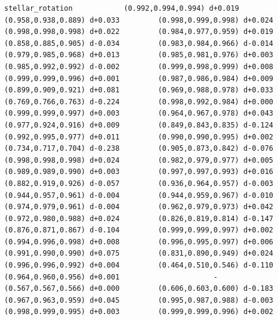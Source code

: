 \documentclass[11pt, letterpaper, openany]{book}
\begin{document}
\begin{empiricalbox}
\begin{lstlisting}[style=terminal]
stellar_rotation            (0.992,0.994,0.994) d+0.019         (0.958,0.938,0.889) d+0.033         (0.998,0.999,0.998) d+0.024         (0.998,0.998,0.998) d+0.022         (0.984,0.977,0.959) d+0.019         (0.858,0.885,0.905) d-0.034         (0.983,0.984,0.966) d-0.014         (0.979,0.985,0.968) d+0.013         (0.985,0.981,0.976) d+0.003         (0.985,0.992,0.992) d-0.002         (0.999,0.998,0.999) d+0.008         (0.999,0.999,0.996) d+0.001         (0.987,0.986,0.984) d+0.009         (0.899,0.909,0.921) d+0.081         (0.969,0.988,0.978) d+0.033         (0.769,0.766,0.763) d-0.224         (0.998,0.992,0.984) d+0.000         (0.999,0.999,0.997) d+0.003         (0.964,0.967,0.978) d+0.043         (0.977,0.924,0.916) d+0.009         (0.849,0.843,0.835) d-0.124         (0.992,0.995,0.977) d+0.011         (0.990,0.990,0.995) d+0.002         (0.734,0.717,0.704) d-0.238         (0.905,0.873,0.842) d-0.076         (0.998,0.998,0.998) d+0.024         (0.982,0.979,0.977) d+0.005         (0.989,0.989,0.990) d+0.003         (0.997,0.997,0.993) d+0.016         (0.882,0.919,0.926) d-0.057         (0.936,0.964,0.957) d-0.003         (0.944,0.957,0.961) d-0.004         (0.944,0.959,0.967) d-0.010         (0.974,0.979,0.961) d-0.004         (0.962,0.979,0.973) d+0.042         (0.972,0.980,0.988) d+0.024         (0.826,0.819,0.814) d-0.147         (0.876,0.871,0.867) d-0.104         (0.999,0.999,0.997) d+0.002         (0.994,0.996,0.998) d+0.008         (0.996,0.995,0.997) d+0.006         (0.991,0.990,0.990) d+0.075         (0.831,0.890,0.949) d+0.024         (0.996,0.996,0.992) d+0.004         (0.464,0.510,0.546) d-0.110         (0.964,0.960,0.956) d+0.001                      -                      (0.567,0.567,0.566) d+0.000         (0.606,0.603,0.600) d-0.183         (0.967,0.963,0.959) d+0.045         (0.995,0.987,0.988) d-0.003         (0.998,0.999,0.995) d+0.003         (0.999,0.999,0.996) d+0.002     

\end{lstlisting}
\end{empiricalbox}
\end{document}
